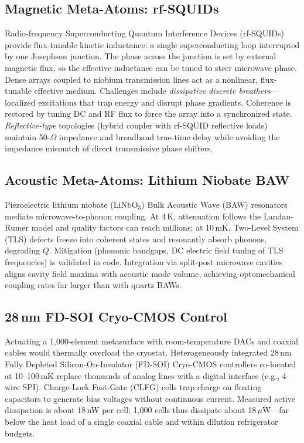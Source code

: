 \documentclass[11pt, a4paper]{article}
\begin{document}
\subsection{Magnetic Meta-Atoms: rf-SQUIDs}

Radio-frequency Superconducting Quantum Interference Devices (rf-SQUIDs) provide flux-tunable kinetic inductance: a single superconducting loop interrupted by one Josephson junction. The phase across the junction is set by external magnetic flux, so the effective inductance can be tuned to steer microwave phase. Dense arrays coupled to niobium transmission lines act as a nonlinear, flux-tunable effective medium. Challenges include \emph{dissipative discrete breathers}---localized excitations that trap energy and disrupt phase gradients. Coherence is restored by tuning DC and RF flux to force the array into a synchronized state. \emph{Reflective-type} topologies (hybrid coupler with rf-SQUID reflective loads) maintain 50-$\Omega$ impedance and broadband true-time delay while avoiding the impedance mismatch of direct transmissive phase shifters.

\subsection{Acoustic Meta-Atoms: Lithium Niobate BAW}

Piezoelectric lithium niobate ($\mathrm{LiNbO}_3$) Bulk Acoustic Wave (BAW) resonators mediate microwave-to-phonon coupling. At 4\,K, attenuation follows the Landau-Rumer model and quality factors can reach millions; at 10\,mK, Two-Level System (TLS) defects freeze into coherent states and resonantly absorb phonons, degrading $Q$. Mitigation (phononic bandgaps, DC electric field tuning of TLS frequencies) is validated in code. Integration via split-post microwave cavities aligns cavity field maxima with acoustic mode volume, achieving optomechanical coupling rates far larger than with quartz BAWs.

\subsection{28\,nm FD-SOI Cryo-CMOS Control}

Actuating a 1,000-element metasurface with room-temperature DACs and coaxial cables would thermally overload the cryostat. Heterogeneously integrated 28\,nm Fully Depleted Silicon-On-Insulator (FD-SOI) Cryo-CMOS controllers co-located at 10--100\,mK replace thousands of analog lines with a digital interface (e.g., 4-wire SPI). Charge-Lock Fast-Gate (CLFG) cells trap charge on floating capacitors to generate bias voltages without continuous current. Measured active dissipation is about 18\,nW per cell; 1,000 cells thus dissipate about 18\,$\mu$W---far below the heat load of a single coaxial cable and within dilution refrigerator budgets.
\end{document}
